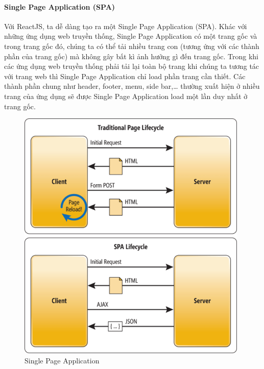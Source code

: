 \paragraph{Single Page Application (SPA)}
Với ReactJS, ta dễ dàng tạo ra một Single Page Application (SPA).
Khác với những ứng dụng web truyền thống, Single Page Application
có một trang gốc và trong trang gốc đó, chúng ta có thể tải
nhiều trang con (tương ứng với các thành phần của trang gốc) mà
không gây bất kì ảnh hưởng gì đến trang gốc. Trong khi các
ứng dụng web truyền thống phải tải lại toàn bộ trang khi
chúng ta tương tác với trang web thì Single Page Application chỉ load
phần trang cần thiết. Các thành phần chung như header, footer, menu,
side bar,… thường xuất hiện ở nhiều trang của ứng dụng sẽ được
Single Page Application load một lần duy nhất ở trang gốc.

\begin{figure}[H]
\centering
\includegraphics[width=11cm]{images/spa.png}
\caption{Single Page Application }
\label{fig:spa}
\end{figure}

